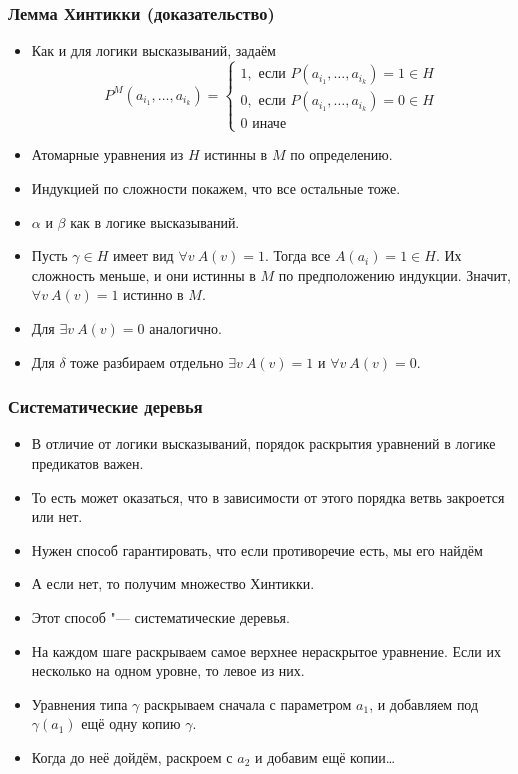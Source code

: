 \documentclass[10pt]{beamer}
\begin{document}
\begin{frame}
    \frametitle{Лемма Хинтикки (доказательство)}
    \begin{itemize}
        \item Как и для логики высказываний, задаём
        \[ P^M(a_{i_1},\ldots,a_{i_k}) = \left\{ \begin{array}{l}
            1, \text{ если } P(a_{i_1},\ldots,a_{i_k})=1 \in H \\
            0, \text{ если } P(a_{i_1},\ldots,a_{i_k})=0 \in H \\
            0 \text{ иначе} 
        \end{array} \right. \]
        \item Атомарные уравнения из $H$ истинны в $M$ по определению. 
        \pause
        \item Индукцией по сложности покажем, что все остальные тоже.
        \item $\alpha$ и $\beta$ как в логике высказываний.
        \pause
        \item Пусть $\gamma \in H$ имеет вид $\forall v ~ A(v)=1$. Тогда все $A(a_i)=1 \in H$. Их сложность меньше, и они истинны в $M$ по предположению индукции. Значит, $\forall v ~ A(v)=1$ истинно в $M$. 
        \pause
        \item Для $\exists v ~ A(v)=0$ аналогично.
        \pause
        \item Для $\delta$ тоже разбираем отдельно $\exists v ~ A(v)=1$ и $\forall v ~ A(v)=0$.
    \end{itemize}
\end{frame}

\begin{frame}
    \frametitle{Систематические деревья}
    \begin{itemize}
        \item В отличие от логики высказываний, порядок раскрытия уравнений в логике предикатов важен.
        \item То есть может оказаться, что в зависимости от этого порядка ветвь закроется или нет.
        \item Нужен способ гарантировать, что если противоречие есть, мы его найдём
        \item А если нет, то получим множество Хинтикки.
        \item Этот способ "--- систематические деревья.
        \pause
        \item На каждом шаге раскрываем самое верхнее нераскрытое уравнение. Если их несколько на одном уровне, то левое из них.
        \item Уравнения типа $\gamma$ раскрываем сначала с параметром $a_1$, и добавляем под $\gamma(a_1)$ ещё одну копию $\gamma$.
        \item Когда до неё дойдём, раскроем с $a_2$ и добавим ещё копии\ldots
    \end{itemize}
\end{frame}
\end{document}
